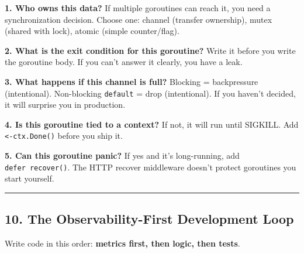 \documentclass[
]{article}
\begin{document}
\textbf{1. Who owns this data?} If multiple goroutines can reach it, you
need a synchronization decision. Choose one: channel (transfer
ownership), mutex (shared with lock), atomic (simple counter/flag).

\textbf{2. What is the exit condition for this goroutine?} Write it
before you write the goroutine body. If you can't answer it clearly, you
have a leak.

\textbf{3. What happens if this channel is full?} Blocking =
backpressure (intentional). Non-blocking \texttt{default} = drop
(intentional). If you haven't decided, it will surprise you in
production.

\textbf{4. Is this goroutine tied to a context?} If not, it will run
until SIGKILL. Add \texttt{\textless{}-ctx.Done()} before you ship it.

\textbf{5. Can this goroutine panic?} If yes and it's long-running, add
\texttt{defer\ recover()}. The HTTP recover middleware doesn't protect
goroutines you start yourself.

\begin{center}\rule{0.5\linewidth}{0.5pt}\end{center}

\hypertarget{the-observability-first-development-loop}{%
\subsection{10. The Observability-First Development
Loop}\label{the-observability-first-development-loop}}

Write code in this order: \textbf{metrics first, then logic, then
tests}.
\end{document}
